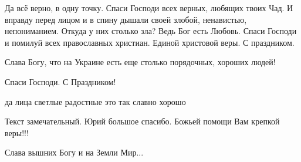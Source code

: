 \begin{itemize}
Да всё верно, в одну точку. Спаси Господи всех верных, любящих твоих Чад. И вправду
перед лицом и в спину дышали своей злобой, ненавистью, непониманием. Откуда у них
столько зла? Ведь Бог есть Любовь. Спаси Господи и помилуй всех православных
христиан. Единой христовой веры. С праздником.


 
Слава Богу, что на Украине есть еще столько порядочных, хороших людей!

 
Спаси Господи. С Праздником!🙏

 
да лица светлые радостные это так славно хорошо

 
Текст замечательный. Юрий большое спасибо. Божьей помощи Вам крепкой веры!!!

 
Слава вышних Богу и на Земли Мир...

 

\end{itemize}
